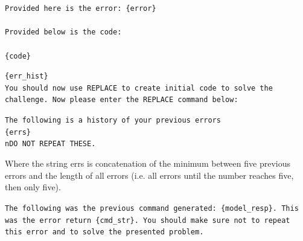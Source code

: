 \documentclass[11pt, a4paper]{gdm_format}
\begin{document}
\begin{tcolorbox}[breakable,colback=orange!5!white, colframe=orange!80!black, title=Code Repair Tool Prompt]
\texttt{Provided here is the error: \{error\}\\\\Provided below is the code:\\\\\{code\}}
\end{tcolorbox}



\begin{tcolorbox}[breakable,colback=orange!5!white, colframe=orange!80!black, title=Initial Code Generation Prompt]
\texttt{\{err\_hist\}\\You should now use \textasciigrave\textasciigrave\textasciigrave REPLACE to create initial code to solve the challenge. Now please enter the \textasciigrave\textasciigrave\textasciigrave REPLACE command below:\\}
\end{tcolorbox}


\begin{tcolorbox}[breakable,colback=orange!5!white, colframe=orange!80!black, title=Initial Code Generation Error Prompt (err\_hist)]
\texttt{The following is a history of your previous errors\\\{errs\}\\nDO NOT REPEAT THESE.}
\end{tcolorbox}

Where the string errs is concatenation of the minimum between five previous errors and the length of all errors (i.e. all errors until the number reaches five, then only five).

\begin{tcolorbox}[breakable,colback=orange!5!white, colframe=orange!80!black, title=Initial Code Generation Error Prompt (err)]
\texttt{The following was the previous command generated: \{model\_resp\}. This was the error return \{cmd\_str\}. You should make sure not to repeat this error and to solve the presented problem.}
\end{tcolorbox}
\end{document}
